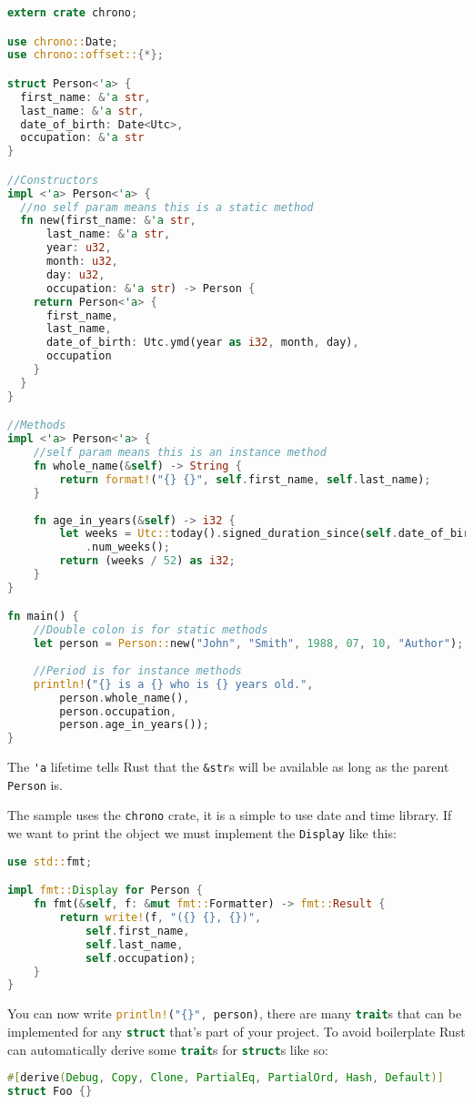 \documentclass[a4paper,11pt]{article}
\begin{document}
\begin{lstlisting}[language=Rust,frame=single]
extern crate chrono;

use chrono::Date;
use chrono::offset::{*};

struct Person<'a> {
  first_name: &'a str,
  last_name: &'a str,
  date_of_birth: Date<Utc>,
  occupation: &'a str
}

//Constructors
impl <'a> Person<'a> {
  //no self param means this is a static method
  fn new(first_name: &'a str, 
      last_name: &'a str, 
      year: u32,
      month: u32, 
      day: u32, 
      occupation: &'a str) -> Person {
    return Person<'a> {
      first_name,
      last_name,
      date_of_birth: Utc.ymd(year as i32, month, day),
      occupation
    }
  }
}

//Methods
impl <'a> Person<'a> {
    //self param means this is an instance method
    fn whole_name(&self) -> String {
        return format!("{} {}", self.first_name, self.last_name);
    }  
    
    fn age_in_years(&self) -> i32 {
        let weeks = Utc::today().signed_duration_since(self.date_of_birth)
            .num_weeks();
        return (weeks / 52) as i32;
    }
}

fn main() {
    //Double colon is for static methods
    let person = Person::new("John", "Smith", 1988, 07, 10, "Author");
    
    //Period is for instance methods
    println!("{} is a {} who is {} years old.", 
        person.whole_name(), 
        person.occupation, 
        person.age_in_years());
}
\end{lstlisting}

The \lstinline{'a} lifetime tells Rust that the \lstinline{&str}s will be available as long as the parent \lstinline{Person} is.

The sample uses the \lstinline{chrono} crate, it is a simple to use date and time library. 
If we want to print the object we must implement the \lstinline{Display} like this:

\begin{lstlisting}[language=Rust,frame=single]
use std::fmt;

impl fmt::Display for Person {
    fn fmt(&self, f: &mut fmt::Formatter) -> fmt::Result {
        return write!(f, "({} {}, {})", 
            self.first_name, 
            self.last_name, 
            self.occupation);
    }
}
\end{lstlisting}

You can now write \lstinline[language=Rust]|println!("{}", person)|, there are many \lstinline[language=Rust]{trait}s that can be implemented for any \lstinline[language=Rust]{struct} that's part of your project.\newline
To avoid boilerplate Rust can automatically derive some \lstinline[language=Rust]{trait}s for \lstinline[language=Rust]{struct}s like so:
\begin{lstlisting}[language=Rust,frame=single]
#[derive(Debug, Copy, Clone, PartialEq, PartialOrd, Hash, Default)]
struct Foo {}
\end{lstlisting}
\end{document}
